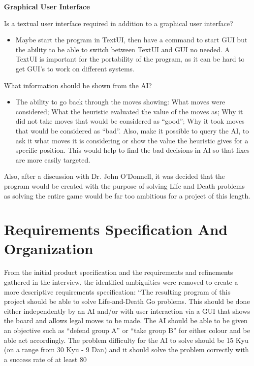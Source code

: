 \documentclass{l3proj}
\begin{document}
\textbf{Graphical User Interface}

Is a textual user interface required in addition to a graphical user interface?
\begin{itemize}
\item Maybe start the program in TextUI, then have a command to start GUI but the ability to be able to switch between TextUI and GUI no needed.  A TextUI is important for the portability of the program, as it can be hard to get GUI’s to work on different systems.
\end{itemize}
What information should be shown from the AI?
\begin{itemize}
\item The ability to go back through the moves showing: What moves were considered; What the heuristic evaluated the value of the moves as; Why it did not take moves that would be considered as “good”;  Why it took moves that would be considered as “bad”.  Also, make it possible to query the AI, to ask it what moves it is considering or show the value the heuristic gives for a specific position.  This would help to find the bad decisions in AI so that fixes are more easily targeted.
\end{itemize}

Also, after a discussion with Dr. John O’Donnell, it was decided that the program would be created with the purpose of solving Life and Death problems as solving the entire game would be far too ambitious for a project of this length. 

\section{Requirements Specification And Organization}

From the initial product specification and the requirements and refinements gathered in the interview, the identified ambiguities were removed to create a more descriptive requirements specification:  “The resulting program of this project should be able to solve Life-and-Death Go problems. This should be done either independently by an AI and/or with user interaction via a GUI that shows the board and allows legal moves to be made. The AI should be able to be given an objective such as “defend group A” or “take group B” for either colour and be able act accordingly. The problem difficulty for the AI to solve should be 15 Kyu (on a range from 30 Kyu - 9 Dan) and it should solve the problem correctly with a success rate of at least 80%
\end{document}
